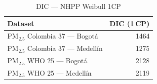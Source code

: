 \begin{table}[htbp]
\centering
\caption{DIC --- NHPP Weibull 1CP}
\label{tab:nhpp_dic_1cp}
\begin{tabular}{lr}
\toprule
Dataset & DIC (1\,CP) \\
\midrule
PM$_{2.5}$ Colombia 37 --- Bogot\'{a} & 1464 \\
PM$_{2.5}$ Colombia 37 --- Medell\'{i}n & 1275 \\
PM$_{2.5}$ WHO 25 --- Bogot\'{a} & 2128 \\
PM$_{2.5}$ WHO 25 --- Medell\'{i}n & 2119 \\
\bottomrule
\end{tabular}
\end{table}
